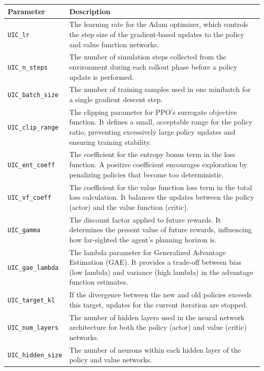 \begin{xltabular}{\textwidth}{lX}
        \toprule
        Parameter & Description \\
        \midrule
        \texttt{UIC\_lr}                & The learning rate for the Adam optimizer, which controls the step size of the gradient-based updates to the policy and value function networks. \\
        \texttt{UIC\_n\_steps}          & The number of simulation steps collected from the environment during each rollout phase before a policy update is performed. \\
        \texttt{UIC\_batch\_size}       & The number of training samples used in one minibatch for a single gradient descent step. \\
        \texttt{UIC\_clip\_range}       & The clipping parameter for PPO's surrogate objective function. It defines a small, acceptable range for the policy ratio, preventing excessively large policy updates and ensuring training stability. \\
        \texttt{UIC\_ent\_coeff}        & The coefficient for the entropy bonus term in the loss function. A positive coefficient encourages exploration by penalizing policies that become too deterministic. \\
        \texttt{UIC\_vf\_coeff}         & The coefficient for the value function loss term in the total loss calculation. It balances the updates between the policy (actor) and the value function (critic). \\
        \midrule
        \texttt{UIC\_gamma}             & The discount factor applied to future rewards. It determines the present value of future rewards, influencing how far-sighted the agent's planning horizon is. \\
        \texttt{UIC\_gae\_lambda}       & The lambda parameter for Generalized Advantage Estimation (GAE). It provides a trade-off between bias (low lambda) and variance (high lambda) in the advantage function estimates. \\
        \texttt{UIC\_target\_kl}        & If the  divergence between the new and old policies exceeds this target, updates for the current iteration are stopped. \\
        \midrule
        \texttt{UIC\_num\_layers}       & The number of hidden layers used in the neural network architecture for both the policy (actor) and value (critic) networks. \\
        \texttt{UIC\_hidden\_size}      & The number of neurons within each hidden layer of the policy and value networks. \\

\end{xltabular}

